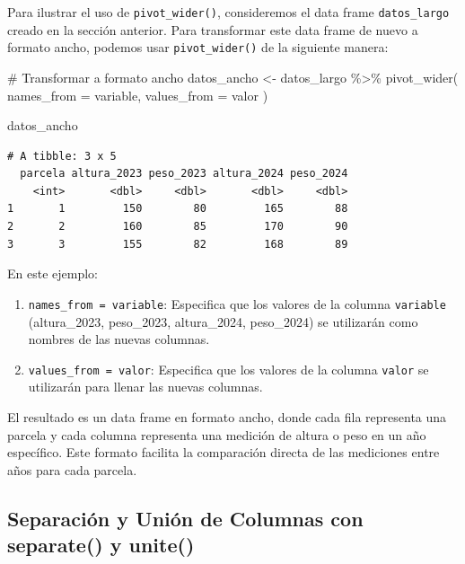 \documentclass[
  spanish,
  a4paper,
  DIV=11,
  numbers=noendperiod,
  onepage,
  openany]{scrreprt}
\newenvironment{Shaded}{\begin{snugshade}}{\end{snugshade}}
\newcommand{\AttributeTok}[1]{\textcolor[rgb]{0.40,0.45,0.13}{#1}}
\newcommand{\CommentTok}[1]{\textcolor[rgb]{0.37,0.37,0.37}{#1}}
\newcommand{\FunctionTok}[1]{\textcolor[rgb]{0.28,0.35,0.67}{#1}}
\newcommand{\NormalTok}[1]{\textcolor[rgb]{0.00,0.23,0.31}{#1}}
\newcommand{\OtherTok}[1]{\textcolor[rgb]{0.00,0.23,0.31}{#1}}
\newcommand{\SpecialCharTok}[1]{\textcolor[rgb]{0.37,0.37,0.37}{#1}}
\begin{document}
Para ilustrar el uso de \texttt{pivot\_wider()}, consideremos el data
frame \texttt{datos\_largo} creado en la sección anterior. Para
transformar este data frame de nuevo a formato ancho, podemos usar
\texttt{pivot\_wider()} de la siguiente manera:

\begin{Shaded}
\begin{Highlighting}[]
\CommentTok{\# Transformar a formato ancho}
\NormalTok{datos\_ancho }\OtherTok{\textless{}{-}}\NormalTok{ datos\_largo }\SpecialCharTok{\%\textgreater{}\%}
  \FunctionTok{pivot\_wider}\NormalTok{(}
    \AttributeTok{names\_from =}\NormalTok{ variable,}
    \AttributeTok{values\_from =}\NormalTok{ valor}
\NormalTok{  )}

\NormalTok{datos\_ancho}
\end{Highlighting}
\end{Shaded}

\begin{verbatim}
# A tibble: 3 x 5
  parcela altura_2023 peso_2023 altura_2024 peso_2024
    <int>       <dbl>     <dbl>       <dbl>     <dbl>
1       1         150        80         165        88
2       2         160        85         170        90
3       3         155        82         168        89
\end{verbatim}

En este ejemplo:

\begin{enumerate}
\def\labelenumi{\arabic{enumi}.}
\item
  \texttt{names\_from\ =\ variable}: Especifica que los valores de la
  columna \texttt{variable} (altura\_2023, peso\_2023, altura\_2024,
  peso\_2024) se utilizarán como nombres de las nuevas columnas.
\item
  \texttt{values\_from\ =\ valor}: Especifica que los valores de la
  columna \texttt{valor} se utilizarán para llenar las nuevas columnas.
\end{enumerate}

El resultado es un data frame en formato ancho, donde cada fila
representa una parcela y cada columna representa una medición de altura
o peso en un año específico. Este formato facilita la comparación
directa de las mediciones entre años para cada parcela.

\subsection{Separación y Unión de Columnas con separate() y
unite()}\label{separaciuxf3n-y-uniuxf3n-de-columnas-con-separate-y-unite}
\end{document}

